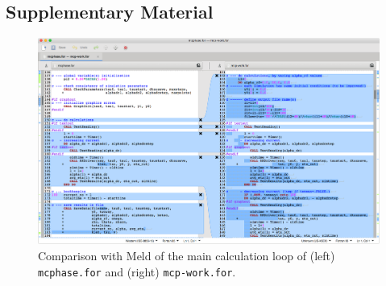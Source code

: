 \begin{supplement}


\section{Supplementary Material}


\begin{figure}[h]
    \centering
    \includegraphics[width = \textwidth]{figures/meld-comparison.png}
    \caption{Comparison with Meld of the main calculation loop of (left) \texttt{mcphase.for} and (right) \texttt{mcp-work.for}.}
    \label{fig:meld-comparison}
\end{figure}


\end{supplement}
